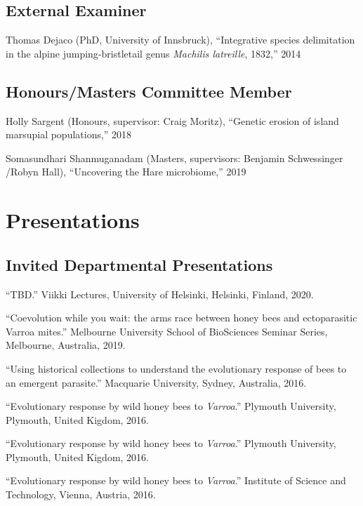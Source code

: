 \documentclass[11pt]{article}
\def\printdate#1{\xprintdate#1-}
\def\xprintdate#1-#2-#3-{#1}
\begin{document}
\subsection{External Examiner}
\ind Thomas Dejaco (PhD, University of Innsbruck), ``Integrative species delimitation in the alpine jumping‐bristletail genus
\textit{Machilis latreille}, 1832,'' 2014

\subsection{Honours/Masters Committee Member}
\ind Holly Sargent (Honours, supervisor: Craig Moritz), ``Genetic erosion of island marsupial populations,'' 2018

\ind Somasundhari Shanmuganadam (Masters, supervisors: Benjamin Schwessinger /Robyn Hall), ``Uncovering the Hare microbiome,'' 2019


\section{Presentations}

\subsection{Invited Departmental Presentations}

\ind ``TBD.'' Viikki Lectures, University of Helsinki, Helsinki, Finland, \printdate{2020-00-00}.


\ind ``Coevolution while you wait: the arms race between honey bees and
ectoparasitic Varroa mites.'' Melbourne University School of BioSciences Seminar Series, Melbourne, Australia, \printdate{2019-00-00}.








\ind ``Using historical collections to understand the evolutionary response of
bees to an emergent parasite.'' Macquarie University, Sydney, Australia, \printdate{2016-00-00}.


\ind ``Evolutionary response by wild honey bees to \textit{Varroa}.'' Plymouth University, Plymouth, United Kigdom, \printdate{2016-00-00}.


\ind ``Evolutionary response by wild honey bees to \textit{Varroa}.'' Plymouth University, Plymouth, United Kigdom, \printdate{2016-00-00}.


\ind ``Evolutionary response by wild honey bees to \textit{Varroa}.'' Institute of Science and Technology, Vienna, Austria, \printdate{2016-00-00}.
\end{document}
